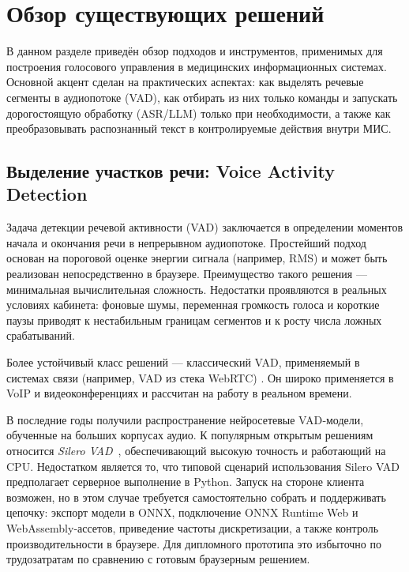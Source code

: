 
\clearpage
\section{Обзор существующих решений}
\label{sec:relatedworks}

В данном разделе приведён обзор подходов и инструментов, применимых для построения голосового управления в медицинских информационных системах.
Основной акцент сделан на практических аспектах: как выделять речевые сегменты в аудиопотоке (VAD), как отбирать из них только команды и запускать дорогостоящую обработку (ASR/LLM) только при необходимости, а также как преобразовывать распознанный текст в контролируемые действия внутри МИС.

\subsection{Выделение участков речи: Voice Activity Detection}

Задача детекции речевой активности (VAD) заключается в определении моментов начала и окончания речи в непрерывном аудиопотоке.
Простейший подход основан на пороговой оценке энергии сигнала (например, RMS) и может быть реализован непосредственно в браузере.
Преимущество такого решения --- минимальная вычислительная сложность.
Недостатки проявляются в реальных условиях кабинета: фоновые шумы, переменная громкость голоса и короткие паузы приводят к нестабильным границам сегментов и к росту числа ложных срабатываний.

Более устойчивый класс решений --- классический VAD, применяемый в системах связи (например, VAD из стека WebRTC) \cite{WebRTC}.
Он широко применяется в VoIP и видеоконференциях и рассчитан на работу в реальном времени.

В последние годы получили распространение нейросетевые VAD‑модели, обученные на больших корпусах аудио.
К популярным открытым решениям относится \textit{Silero VAD}~\cite{SileroVAD}, обеспечивающий высокую точность и работающий на CPU.
Недостатком является то, что типовой сценарий использования Silero VAD предполагает серверное выполнение в Python. Запуск на стороне клиента возможен, но в этом случае требуется самостоятельно собрать и поддерживать цепочку: экспорт модели в ONNX, подключение ONNX Runtime Web и WebAssembly‑ассетов, приведение частоты дискретизации, а также контроль производительности в браузере. Для дипломного прототипа это избыточно по трудозатратам по сравнению с готовым браузерным решением.

